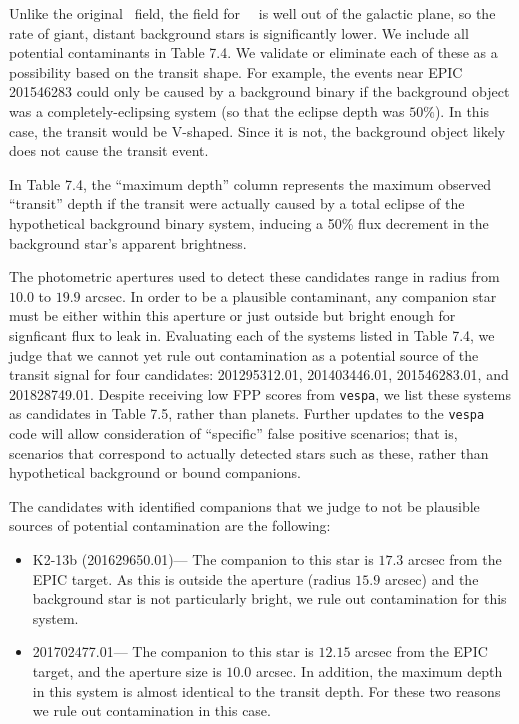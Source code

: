 Unlike the original \kep\ field, the field for \KT\ \Ci\ is
well out of the galactic plane, so the rate of giant, distant background
stars is significantly lower.
We include all potential contaminants in Table 7.4.
We validate or eliminate each of these as a possibility based on the transit shape.
For example, the events near EPIC 201546283 could only be caused by a
background binary if the background object was a completely-eclipsing system
(so that the eclipse depth was $50\%$).
In this case, the transit would be V-shaped.
Since it is not, the background object likely does not cause
the transit event.


In Table 7.4, the ``maximum depth'' column represents
the maximum observed ``transit'' depth if the transit were actually caused
by a total eclipse of the hypothetical background binary system, inducing
a 50\% flux decrement in the background star's apparent brightness.

The photometric apertures used to detect these candidates range in radius from
$10.0$ to $19.9$ arcsec.  In order to be a plausible contaminant,
any companion star must
be either within this aperture or just outside but bright
enough for signficant flux to leak in.
Evaluating each of the systems listed in Table 7.4, we judge that we cannot yet
rule out contamination as a potential source of the transit signal for four
candidates: 201295312.01, 201403446.01, 201546283.01, and 201828749.01.
Despite receiving
low FPP scores from \texttt{vespa}, we list these systems as candidates in
Table 7.5, rather than planets.  Further updates to the \texttt{vespa} code
will allow consideration of ``specific'' false positive scenarios; that is,
scenarios that correspond to actually detected stars such as these, rather than
hypothetical background or bound companions.

The candidates with identified companions that we judge to not be plausible
sources of potential contamination are the following:
\begin{itemize}


\item K2-13b (201629650.01)--- The companion to this star is $17.3$ arcsec from
the EPIC target.  As this is outside the aperture
(radius $15.9$ arcsec) and the background star is not particularly bright,
we rule out contamination for this system.

\item 201702477.01--- The companion to this star is $12.15$ arcsec from the
EPIC target, and the aperture size is $10.0$ arcsec.  In addition,
the maximum depth in this system is almost identical to the transit depth.
For these two reasons we rule out contamination in this case.

\end{itemize}

